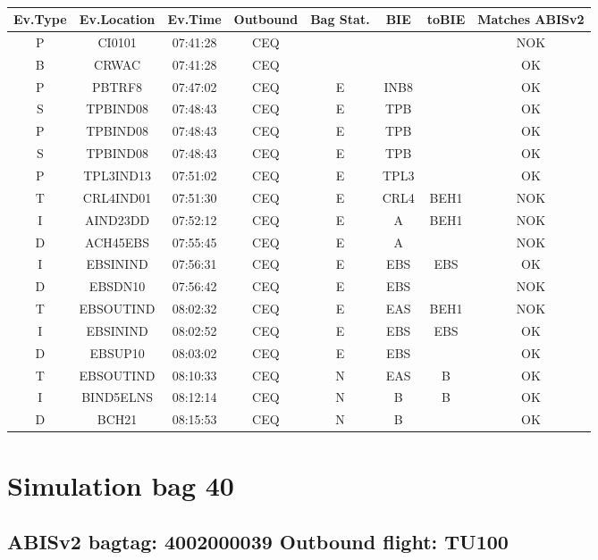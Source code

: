 \documentclass{report}
\begin{document}
\paragraph{}
\begin{longtable}{cccccccc}    \toprule
\rowcolor{white!50}
\textbf{Ev.Type} & \textbf{Ev.Location} & \textbf{Ev.Time} & \textbf{Outbound} & \textbf{Bag Stat.} & \textbf{BIE} & \textbf{toBIE} & \textbf{Matches ABISv2} \\\midrule
P & CI0101 & 07:41:28  & CEQ &  &  &  & NOK\\
B & CRWAC & 07:41:28  & CEQ &  &  &  & OK\\
P & PBTRF8 & 07:47:02  & CEQ & E & INB8 &  & OK\\
S & TPBIND08 & 07:48:43  & CEQ & E & TPB &  & OK\\
P & TPBIND08 & 07:48:43  & CEQ & E & TPB &  & OK\\
S & TPBIND08 & 07:48:43  & CEQ & E & TPB &  & OK\\
P & TPL3IND13 & 07:51:02  & CEQ & E & TPL3 &  & OK\\
T & CRL4IND01 & 07:51:30  & CEQ & E & CRL4 & BEH1 & NOK\\
I & AIND23DD & 07:52:12  & CEQ & E & A & BEH1 & NOK\\
D & ACH45EBS & 07:55:45  & CEQ & E & A &  & NOK\\
I & EBSININD & 07:56:31  & CEQ & E & EBS & EBS & OK\\
D & EBSDN10 & 07:56:42  & CEQ & E & EBS &  & NOK\\
T & EBSOUTIND & 08:02:32  & CEQ & E & EAS & BEH1 & NOK\\
I & EBSININD & 08:02:52  & CEQ & E & EBS & EBS & OK\\
D & EBSUP10 & 08:03:02  & CEQ & E & EBS &  & OK\\
T & EBSOUTIND & 08:10:33  & CEQ & N & EAS & B & OK\\
I & BIND5ELNS & 08:12:14  & CEQ & N & B & B & OK\\
D & BCH21 & 08:15:53  & CEQ & N & B &  & OK\\
\bottomrule
\end{longtable}
\pagebreak
\section*{Simulation bag 40}
\subsection*{ABISv2 bagtag: 4002000039 Outbound flight: TU100}
\end{document}
